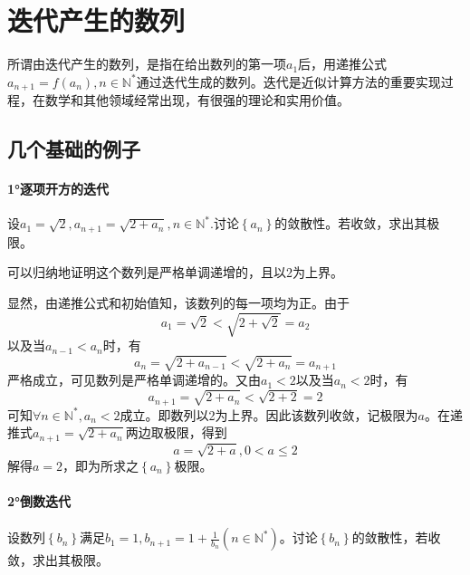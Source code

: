 \section{迭代产生的数列}
\label{sec:analysis-iterations}
所谓由迭代产生的数列，是指在给出数列的第一项\(a_{1}\)后，用递推公式\(a_{n + 1} = f \left( a_{n} \right) , n \in \mathbb{N}^{*}\)通过迭代生成的数列。迭代是近似计算方法的重要实现过程，在数学和其他领域经常出现，有很强的理论和实用价值。

\subsection{几个基础的例子}\label{subsec:iteration-examples}
\paragraph{1°逐项开方的迭代} \mbox{}

设\(a_{1} = \sqrt{2} , a_{n + 1} = \sqrt{2 + a_{n}} , n \in \mathbb{N}^{*}\).讨论\(\left\{ a_{n} \right\}\)的敛散性。若收敛，求出其极限。

可以归纳地证明这个数列是严格单调递增的，且以2为上界。

显然，由递推公式和初始值知，该数列的每一项均为正。由于
\begin{equation}
    a_{1} = \sqrt{2} < \sqrt{2 + \sqrt{2}} = a_{2}
\end{equation}
以及当\(a_{n - 1} < a_{n}\)时，有
\begin{equation}
    a_{n} = \sqrt{2 + a_{n - 1}} < \sqrt{2 + a_{n}} = a_{n + 1}
\end{equation}
严格成立，可见数列是严格单调递增的。又由\(a_{1} < 2\)以及当\(a_{n} < 2\)时，有
\begin{equation}
    a_{n + 1} = \sqrt{2 + a_{n}} < \sqrt{2 + 2} = 2
\end{equation}
可知\(\forall n \in \mathbb{N}^{*} , a_{n} < 2\)成立。即数列以2为上界。因此该数列收敛，记极限为\(a\)。在递推式\(a_{n+1}=\sqrt{2+a_n}\)两边取极限，得到
\begin{equation}
    a = \sqrt{2 + a} , 0 < a \le 2
\end{equation}
解得\(a = 2\)，即为所求之\(\left\{ a_{n} \right\}\)极限。

\paragraph{2°倒数迭代} \mbox{}

设数列\(\left\{ b_{n} \right\}\)满足\(b_{1} = 1 , b_{n + 1} = 1 + \frac{1}{b_{n}} \left( n \in \mathbb{N}^{*} \right)\)。讨论\(\left\{ b_{n} \right\}\)的敛散性，若收敛，求出其极限。

